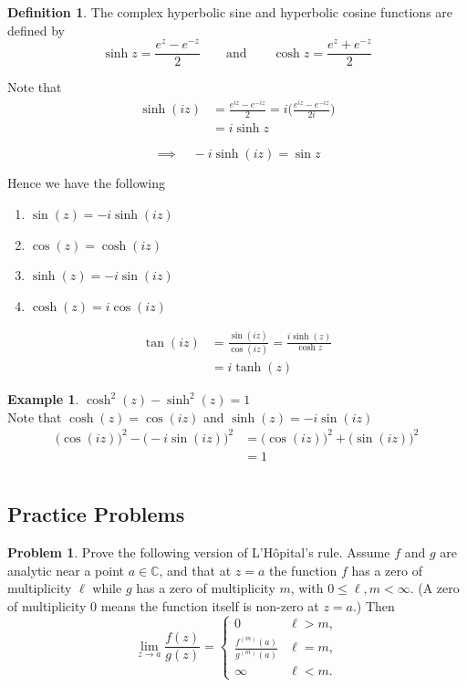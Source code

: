 \documentclass[11pt,a4paper]{article}
\theoremstyle{definition}
\newtheorem{definition}[thm]{Definition}
\newtheorem{example}[thm]{Example}
\newtheorem{problemx}{Problem}[section]
\newenvironment{problem}{\begin{problemx}}{\end{problemx}}
\begin{document}
\begin{definition}
The complex hyperbolic sine and hyperbolic cosine functions are defined by 
$$\sinh z = \frac{e^z - e^{-z}}{2}\qquad \text{and}\qquad \cosh z = \frac{e^z  + e^{-z}}{2}$$



Note that
\begin{align*}
\sinh (iz) & = \frac{e^{iz} - e^{-iz}}{2} = i\Big(\frac{e^{iz} - e^{-iz}}{2i}\Big)\\
& = i\sinh z
\end{align*}

$$\implies \quad  -i\sinh (iz) = \sin z$$





Hence we have the following
\begin{enumerate}
\item $\sin (z) = -i\sinh (iz)$
\item $\cos (z) = \cosh (iz)$
\item $\sinh (z) = -i\sin (iz)$
\item $\cosh (z) = i\cos (iz)$
\end{enumerate}

\begin{align*}
\tan (iz) & = \frac{\sin (iz)}{\cos (iz)} = \frac{i\sinh(z)}{\cosh z}\\
& = i\tanh (z)
\end{align*}
\end{definition}

\begin{example}
$\cosh^2(z)  - \sinh^2(z) = 1$\\

Note that $\cosh (z) = \cos (iz)$ and $\sinh (z) = -i\sin (iz)$
\begin{align*}
\big(\cos (iz)\big)^2 - \big(-i\sin (iz)\big)^2 & = \big(\cos (iz)\big)^2 + \big(\sin (iz)\big)^2\\
& = 1\\\\
\end{align*}
\end{example}

{\color[wave]{485}\subsection{Practice Problems}}

\begin{problem}
Prove the following version of L'H\^opital's rule. Assume $f$ and $g$ are
analytic near a point $a \in \mathbb{C}$, and that at $z = a$ the function $f$
has a zero of multiplicity $\ell$ while $g$ has a zero of multiplicity $m$, with
$0 \leq \ell, m < \infty$. (A zero of multiplicity $0$ means the function itself
is non-zero at $z = a$.) Then
$$\lim_{z \rightarrow a}\frac{f(z)}{g(z)} =
\begin{cases}
0 & \ell > m,\\[2pt]
\frac{f^{(m)}(a)}{g^{(m)}(a)} & \ell = m,\\[6pt]
\infty & \ell < m.
\end{cases}$$
\end{problem}
\end{document}
